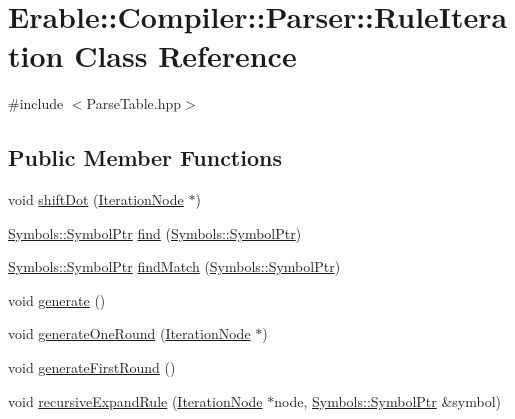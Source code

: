 \hypertarget{class_erable_1_1_compiler_1_1_parser_1_1_rule_iteration}{}\section{Erable\+::Compiler\+::Parser\+::Rule\+Iteration Class Reference}
\label{class_erable_1_1_compiler_1_1_parser_1_1_rule_iteration}


{\ttfamily \#include $<$Parse\+Table.\+hpp$>$}

\subsection*{Public Member Functions}
\begin{DoxyCompactItemize}
\item 
void \mbox{\hyperlink{class_erable_1_1_compiler_1_1_parser_1_1_rule_iteration_aeb8b75387f60c6f92c94124fef149a3e}{shift\+Dot}} (\mbox{\hyperlink{struct_erable_1_1_compiler_1_1_parser_1_1_iteration_node}{Iteration\+Node}} $\ast$)
\item 
\mbox{\hyperlink{namespace_erable_1_1_compiler_1_1_symbols_a8f0bc762f448ea4d84e8713ab3e140b9}{Symbols\+::\+Symbol\+Ptr}} \mbox{\hyperlink{class_erable_1_1_compiler_1_1_parser_1_1_rule_iteration_ad3a2635baa4caa8648a35ee2ed25c34f}{find}} (\mbox{\hyperlink{namespace_erable_1_1_compiler_1_1_symbols_a8f0bc762f448ea4d84e8713ab3e140b9}{Symbols\+::\+Symbol\+Ptr}})
\item 
\mbox{\hyperlink{namespace_erable_1_1_compiler_1_1_symbols_a8f0bc762f448ea4d84e8713ab3e140b9}{Symbols\+::\+Symbol\+Ptr}} \mbox{\hyperlink{class_erable_1_1_compiler_1_1_parser_1_1_rule_iteration_a086a865a1b222a17e251c149987dff89}{find\+Match}} (\mbox{\hyperlink{namespace_erable_1_1_compiler_1_1_symbols_a8f0bc762f448ea4d84e8713ab3e140b9}{Symbols\+::\+Symbol\+Ptr}})
\item 
void \mbox{\hyperlink{class_erable_1_1_compiler_1_1_parser_1_1_rule_iteration_a90cfe4cc7501262ccf555a1d119b7a1a}{generate}} ()
\item 
void \mbox{\hyperlink{class_erable_1_1_compiler_1_1_parser_1_1_rule_iteration_a58d564d18a470ecb1b9b99f962ce4b9e}{generate\+One\+Round}} (\mbox{\hyperlink{struct_erable_1_1_compiler_1_1_parser_1_1_iteration_node}{Iteration\+Node}} $\ast$)
\item 
void \mbox{\hyperlink{class_erable_1_1_compiler_1_1_parser_1_1_rule_iteration_a0c66d23f8b37d69f81ba939e130797f7}{generate\+First\+Round}} ()
\item 
void \mbox{\hyperlink{class_erable_1_1_compiler_1_1_parser_1_1_rule_iteration_af9818a44b7528c9b81cde2aac0e14815}{recursive\+Expand\+Rule}} (\mbox{\hyperlink{struct_erable_1_1_compiler_1_1_parser_1_1_iteration_node}{Iteration\+Node}} $\ast$node, \mbox{\hyperlink{namespace_erable_1_1_compiler_1_1_symbols_a8f0bc762f448ea4d84e8713ab3e140b9}{Symbols\+::\+Symbol\+Ptr}} \&symbol)
\end{DoxyCompactItemize}
